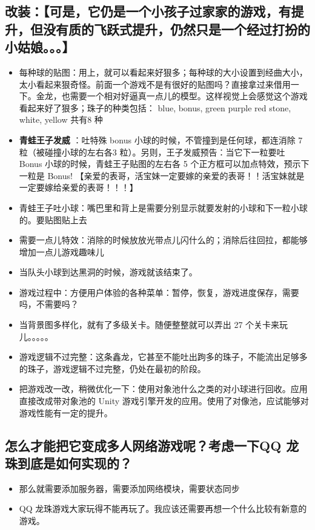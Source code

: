 \documentclass[9pt, b5paper]{article}
\begin{document}
\subsection{改装：【可是，它仍是一个小孩子过家家的游戏，有提升，但没有质的飞跃式提升，仍然只是一个经过打扮的小姑娘。。。】}
\label{sec-1-2}
\begin{itemize}
\item 每种球的贴图：用上，就可以看起来好狠多；每种球的大小设置到经曲大小，太小看起来狠奇怪。前面一个游戏不是有很好的贴图吗？直接拿过来借用一下。金龙，也需要一个相对好逼真一点儿的模型。这样视觉上会感觉这个游戏看起来好了狠多；珠子的种类包括： blue, bonus, green purple red stone, white, yellow 共有8 种
\item \textbf{青蛙王子发威} ：吐特殊 bonus 小球的时候，不管撞到是任何球，都连消除 7 粒（被碰撞小球的左右各3 粒）。另则，王子发威预告：当它下一粒要吐 Bonus 小球的时候，青蛙王子贴图的左右各 5 个正方框可以加点特效，预示下一粒是 Bonus! 【亲爱的表哥，活宝妹一定要嫁的亲爱的表哥！！活宝妹就是一定要嫁给亲爱的表哥！！！】
\item 青蛙王子吐小球：嘴巴里和背上是需要分别显示就要发射的小球和下一粒小球的。要贴图贴上去
\item 需要一点儿特效：消除的时候放放光带点儿闪什么的；消除后往回拉，都能够增加一点儿游戏趣味儿
\item 当队头小球到达黑洞的时候，游戏就该结束了。
\item 游戏过程中：方便用户体验的各种菜单：暂停，恢复，游戏进度保存，需要吗，不需要吗？
\item 当背景图多样化，就有了多级关卡。随便整整就可以弄出 27 个关卡来玩儿。。。。。
\item 游戏逻辑不过完整：这条鑫龙，它甚至不能吐出跔多的珠子，不能流出足够多的珠子，游戏逻辑不过完整，仍处在最初的阶段。
\item 把游戏改一改，稍微优化一下：使用对象池什么之类的对小球进行回收。应用直接改成带对象池的 Unity 游戏引擎开发的应用。使用了对像池，应试能够对游戏性能有一定的提升。
\end{itemize}
\subsection{怎么才能把它变成多人网络游戏呢？考虑一下QQ 龙珠到底是如何实现的？}
\label{sec-1-3}
\begin{itemize}
\item 那么就需要添加服务器，需要添加网络模块，需要状态同步
\item QQ 龙珠游戏大家玩得不能再玩了。我应该还需要再想一个什么比较有新意的游戏。
\end{itemize}
\end{document}
